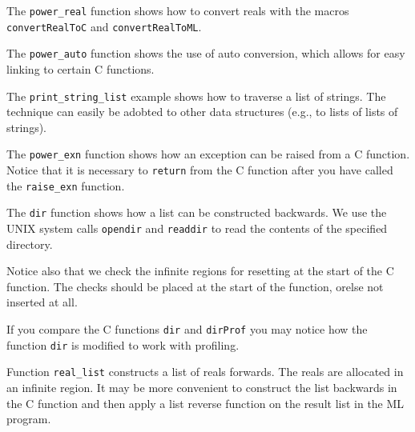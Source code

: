 \documentclass[12pt]{book}
\begin{document}
\begin{example}\label{power_real.ex}
  The \texttt{power\_real} function shows how
  to convert reals with the macros \texttt{convertRealToC} and
  \texttt{convertRealToML}.
\end{example}

\begin{example}\label{power_auto.ex}
  The \texttt{power\_auto} function shows the
  use of auto conversion, which allows for easy linking to certain C
  functions.
\end{example}

\begin{example}\label{print_string_list.ex}
  The \texttt{print\_string\_list}
  example shows how to traverse a list of strings. The technique can
  easily be adobted to other data structures (e.g., to lists of lists
  of strings).
\end{example}

\begin{example}\label{power_exn.ex}
  The \texttt{power\_exn} function shows how an
  exception can be raised from a C function. Notice that it is
  necessary to {\tt return} from the C function after you have called
  the \verb|raise_exn| function.
\end{example}

\begin{example}\label{dir.ex}
  The \texttt{dir} function shows how a list can be
  constructed backwards.  We use the UNIX system calls
  \texttt{opendir} and \texttt{readdir} to read the contents of the
  specified directory.
  
  Notice also that we check the infinite regions for resetting at the
  start of the C function. The checks should be placed at the start of
  the function, orelse not inserted at all.
  
  If you compare the C functions \texttt{dir} and \texttt{dirProf} you may
  notice how the function \texttt{dir} is modified to work with
  profiling.
\end{example}

\begin{example}\label{real_list.ex}
  Function \texttt{real\_list} constructs a list
  of reals forwards. The reals are allocated in an infinite region. It
  may be more convenient to construct the list backwards in the C
  function and then apply a list reverse function on the result list
  in the ML program.
\end{example}
\end{document}
